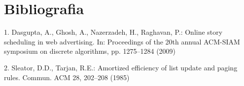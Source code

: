 \documentclass[12pt]{article}
\begin{document}
\section{Bibliografia}
1. Dasgupta, A., Ghosh, A., Nazerzadeh, H., Raghavan, P.: Online story scheduling in web advertising.
In: Proceedings of the 20th annual ACM-SIAM symposium on discrete algorithms, pp. 1275–1284
(2009)

\begin{flushleft}
2. Sleator, D.D., Tarjan, R.E.: Amortized efficiency of list update and paging rules. Commun. ACM 28,
202–208 (1985)
\end{flushleft}
\end{document}
